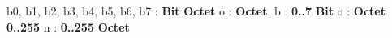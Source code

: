\begin{algorithme}
    {b0, b1, b2, b3, b4, b5, b6, b7 : \textbf{Bit}}
    {\textbf{Octet}}
    {}
    {o : \textbf{Octet}, b : \textbf{0..7}}
    {\textbf{Bit}}
    {}
    {o : \textbf{Octet}}
    {\textbf{0..255}}
    {}
    {n : \textbf{0..255}}
    {\textbf{Octet}}
    {}
\end{algorithme}
